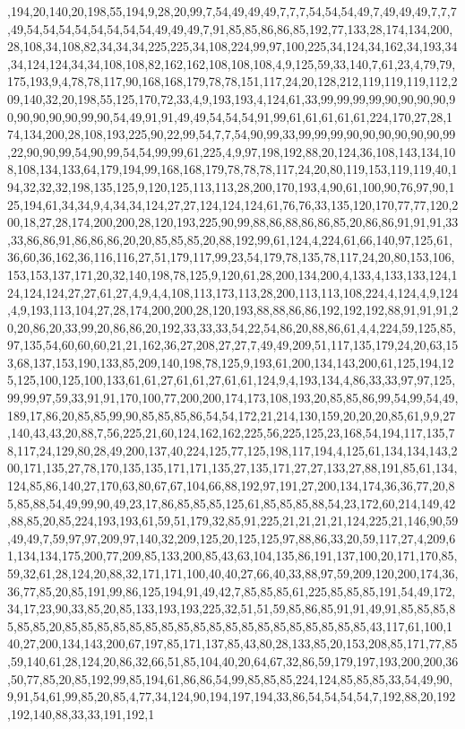 ,194,20,140,20,198,55,194,9,28,20,99,7,54,49,49,49,7,7,7,54,54,54,49,7,49,49,49,7,7,7,49,54,54,54,54,54,54,54,54,49,49,49,7,91,85,85,86,86,85,192,77,133,28,174,134,200,28,108,34,108,82,34,34,34,225,225,34,108,224,99,97,100,225,34,124,34,162,34,193,34,34,124,124,34,34,108,108,82,162,162,108,108,108,4,9,125,59,33,140,7,61,23,4,79,79,175,193,9,4,78,78,117,90,168,168,179,78,78,151,117,24,20,128,212,119,119,119,112,209,140,32,20,198,55,125,170,72,33,4,9,193,193,4,124,61,33,99,99,99,99,90,90,90,90,90,90,90,90,90,99,90,54,49,91,91,49,49,54,54,54,91,99,61,61,61,61,61,224,170,27,28,174,134,200,28,108,193,225,90,22,99,54,7,7,54,90,99,33,99,99,99,90,90,90,90,90,90,99,22,90,90,99,54,90,99,54,54,99,99,61,225,4,9,97,198,192,88,20,124,36,108,143,134,108,108,134,133,64,179,194,99,168,168,179,78,78,78,117,24,20,80,119,153,119,119,40,194,32,32,32,198,135,125,9,120,125,113,113,28,200,170,193,4,90,61,100,90,76,97,90,125,194,61,34,34,9,4,34,34,124,27,27,124,124,124,61,76,76,33,135,120,170,77,77,120,200,18,27,28,174,200,200,28,120,193,225,90,99,88,86,88,86,86,85,20,86,86,91,91,91,33,33,86,86,91,86,86,86,20,20,85,85,85,20,88,192,99,61,124,4,224,61,66,140,97,125,61,36,60,36,162,36,116,116,27,51,179,117,99,23,54,179,78,135,78,117,24,20,80,153,106,153,153,137,171,20,32,140,198,78,125,9,120,61,28,200,134,200,4,133,4,133,133,124,124,124,124,27,27,61,27,4,9,4,4,108,113,173,113,28,200,113,113,108,224,4,124,4,9,124,4,9,193,113,104,27,28,174,200,200,28,120,193,88,88,86,86,192,192,192,88,91,91,91,20,20,86,20,33,99,20,86,86,20,192,33,33,33,54,22,54,86,20,88,86,61,4,4,224,59,125,85,97,135,54,60,60,60,21,21,162,36,27,208,27,27,7,49,49,209,51,117,135,179,24,20,63,153,68,137,153,190,133,85,209,140,198,78,125,9,193,61,200,134,143,200,61,125,194,125,125,100,125,100,133,61,61,27,61,61,27,61,61,124,9,4,193,134,4,86,33,33,97,97,125,99,99,97,59,33,91,91,170,100,77,200,200,174,173,108,193,20,85,85,86,99,54,99,54,49,189,17,86,20,85,85,99,90,85,85,85,86,54,54,172,21,214,130,159,20,20,20,85,61,9,9,27,140,43,43,20,88,7,56,225,21,60,124,162,162,225,56,225,125,23,168,54,194,117,135,78,117,24,129,80,28,49,200,137,40,224,125,77,125,198,117,194,4,125,61,134,134,143,200,171,135,27,78,170,135,135,171,171,135,27,135,171,27,27,133,27,88,191,85,61,134,124,85,86,140,27,170,63,80,67,67,104,66,88,192,97,191,27,200,134,174,36,36,77,20,85,85,88,54,49,99,90,49,23,17,86,85,85,85,125,61,85,85,85,88,54,23,172,60,214,149,42,88,85,20,85,224,193,193,61,59,51,179,32,85,91,225,21,21,21,21,124,225,21,146,90,59,49,49,7,59,97,97,209,97,140,32,209,125,20,125,125,97,88,86,33,20,59,117,27,4,209,61,134,134,175,200,77,209,85,133,200,85,43,63,104,135,86,191,137,100,20,171,170,85,59,32,61,28,124,20,88,32,171,171,100,40,40,27,66,40,33,88,97,59,209,120,200,174,36,36,77,85,20,85,191,99,86,125,194,91,49,42,7,85,85,85,61,225,85,85,85,191,54,49,172,34,17,23,90,33,85,20,85,133,193,193,225,32,51,51,59,85,86,85,91,91,49,91,85,85,85,85,85,85,20,85,85,85,85,85,85,85,85,85,85,85,85,85,85,85,85,85,85,85,43,117,61,100,140,27,200,134,143,200,67,197,85,171,137,85,43,80,28,133,85,20,153,208,85,171,77,85,59,140,61,28,124,20,86,32,66,51,85,104,40,20,64,67,32,86,59,179,197,193,200,200,36,50,77,85,20,85,192,99,85,194,61,86,86,54,99,85,85,85,224,124,85,85,85,33,54,49,90,9,91,54,61,99,85,20,85,4,77,34,124,90,194,197,194,33,86,54,54,54,54,7,192,88,20,192,192,140,88,33,33,191,192,1